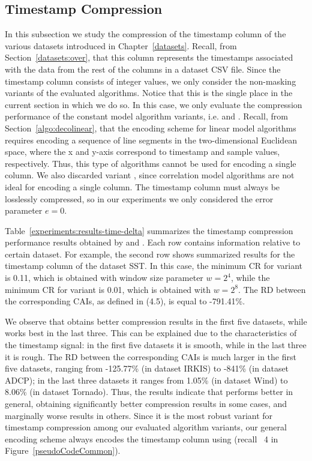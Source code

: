 
\subsection{Timestamp Compression}
\label{secX:timestampComp}

In this subsection we study the compression of the timestamp column of the various datasets introduced in Chapter~\ref{datasets}. Recall, from Section~\ref{datasets:over}, that this column represents the timestamps associated with the data from the rest of the columns in a dataset CSV file. Since the timestamp column consists of integer values, we only consider the non-masking variants of the evaluated algorithms. Notice that this is the single place in the current section in which we do so. In this case, we only evaluate the compression performance of the constant model algorithm variants, i.e.  and . Recall, from Section~\ref{algo:decolinear}, that the encoding scheme for linear model algorithms requires encoding a sequence of line segments in the two-dimensional Euclidean space, where the x and y-axis correspond to timestamp and sample values, respectively. Thus, this type of algorithms cannot be used for encoding a single column. We also discarded variant , since correlation model algorithms are not ideal for encoding a single column. The timestamp column must always be losslessly compressed, so in our experiments we only considered the error parameter $e = 0$.


Table~\ref{experiments:results-time-delta} summarizes the timestamp compression performance results obtained by  and .  Each row contains information relative to certain dataset. For example, the second row shows summarized results for the timestamp column of the dataset SST. In this case, the minimum CR for variant  is 0.11, which is obtained with window size parameter $w=2^4$, while the minimum CR for variant  is 0.01, which is obtained with $w=2^8$. The RD between the corresponding CAIs, as defined in (4.5), is equal to -791.41\%.


We observe that  obtains better compression results in the first five datasets, while  works best in the last three. This can be explained due to the characteristics of the timestamp signal: in the first five datasets it is smooth, while in the last three it is rough. The RD between the corresponding CAIs is much larger in the first five datasets, ranging from -125.77\% (in dataset IRKIS) to -841\% (in dataset ADCP); in the last three datasets it ranges from 1.05\% (in dataset Wind) to 8.06\% (in dataset Tornado). Thus, the results indicate that  performs better in general, obtaining significantly better compression results in some cases, and marginally worse results in others. Since it is the most robust variant for timestamp compression among our evaluated algorithm variants, our general encoding scheme always encodes the timestamp column using  (recall \Line~4 in Figure~\ref{pseudoCodeCommon}).


\clearpage




